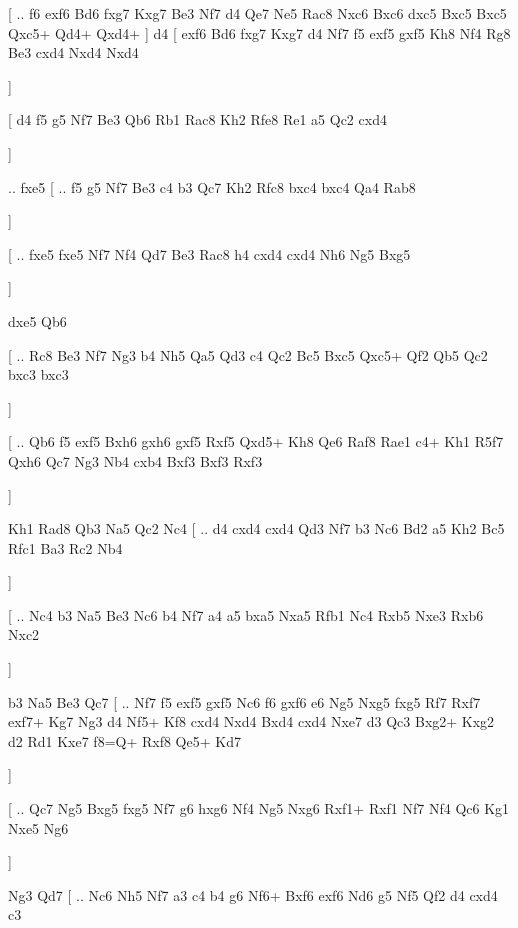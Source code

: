    [ .. f6  exf6 Bd6  fxg7 Kxg7  Be3 Nf7  d4 Qe7  Ne5 Rac8  Nxc6 Bxc6  dxc5 Bxc5  Bxc5 Qxc5+  Qd4+ Qxd4+   ]  d4 [  exf6 Bd6  fxg7 Kxg7  d4 Nf7  f5 exf5  gxf5 Kh8  Nf4 Rg8  Be3 cxd4  Nxd4 Nxd4  
   
     \dummy \showboard] 
     
      [  d4 f5  g5 Nf7  Be3 Qb6  Rb1 Rac8  Kh2 Rfe8  Re1 a5  Qc2 cxd4  
      
      \dummy \showboard  ] 
      
      .. fxe5 [ .. f5  g5 Nf7  Be3 c4  b3 Qc7  Kh2 Rfc8  bxc4 bxc4  Qa4 Rab8   
      
      \dummy  \showboard  ]  
      
      [ .. fxe5  fxe5 Nf7  Nf4 Qd7  Be3 Rac8  h4 cxd4  cxd4 Nh6  Ng5 Bxg5   
      
      \dummy  \showboard  ]  
      
      dxe5   Qb6 
      
      [ .. Rc8  Be3 Nf7  Ng3 b4  Nh5 Qa5  Qd3 c4  Qc2 Bc5  Bxc5 Qxc5+  Qf2 Qb5  Qc2 bxc3  bxc3   
      
      \dummy  \showboard  ]  
      
      [ .. Qb6  f5 exf5  Bxh6 gxh6  gxf5 Rxf5  Qxd5+ Kh8  Qe6 Raf8  Rae1 c4+  Kh1 R5f7  Qxh6 Qc7  Ng3 Nb4  cxb4 Bxf3  Bxf3 Rxf3   
      
      \dummy  \showboard  ]  
      
      Kh1   Rad8    Qb3   Na5    Qc2   Nc4 [ .. d4  cxd4 cxd4  Qd3 Nf7  b3 Nc6  Bd2 a5  Kh2 Bc5  Rfc1 Ba3  Rc2 Nb4   
      
      \dummy  \showboard  ]  
      
      [ .. Nc4  b3 Na5  Be3 Nc6  b4 Nf7  a4 a5  bxa5 Nxa5  Rfb1 Nc4  Rxb5 Nxe3  Rxb6 Nxc2   
      
      \dummy  \showboard  ]  
      
      b3   Na5    Be3   Qc7 [ .. Nf7  f5 exf5  gxf5 Nc6  f6 gxf6  e6 Ng5  Nxg5 fxg5  Rf7 Rxf7  exf7+ Kg7  Ng3 d4  Nf5+ Kf8  cxd4 Nxd4  Bxd4 cxd4  Nxe7 d3  Qc3 Bxg2+  Kxg2 d2  Rd1 Kxe7  f8=Q+ Rxf8  Qe5+ Kd7   
      
      \dummy  \showboard  ]  
      
      [ .. Qc7  Ng5 Bxg5  fxg5 Nf7  g6 hxg6  Nf4 Ng5  Nxg6 Rxf1+  Rxf1 Nf7  Nf4 Qc6  Kg1 Nxe5  Ng6   
      
      \dummy  \showboard  ]  
      
      Ng3   Qd7 [ .. Nc6  Nh5 Nf7  a3 c4  b4 g6  Nf6+ Bxf6  exf6 Nd6  g5 Nf5  Qf2 d4  cxd4 c3   
      
